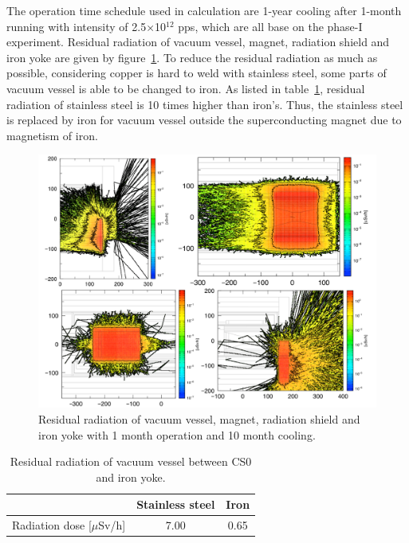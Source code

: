 The operation time schedule used in calculation are 1-year cooling after 1-month running with intensity of 2.5$\times$10$^{12}$ pps, which are all base on the phase-I experiment.
Residual radiation of vacuum vessel, magnet, radiation shield and iron yoke are given by figure~\ref{2part}.
To reduce the residual radiation as much as possible, considering copper is hard to weld with stainless steel, some parts of vacuum vessel is able to be changed to iron.
As listed in table~\ref{vecuum}, residual radiation of stainless steel is 10 times higher than iron's.
Thus, the stainless steel is replaced by iron for vacuum vessel outside the superconducting magnet due to magnetism of iron.
 \begin{figure}[H]
  \centering
  \includegraphics[scale=0.43]{chapter3/fig/partres.pdf}
  \caption{Residual radiation of vacuum vessel, magnet, radiation shield and iron yoke with 1 month operation and 10 month cooling.}
  \label{2part}
 \end{figure}
\begin{table}[H]
 \centering
 \begin{tabular}{ccc} \hline \hline
  & Stainless steel & Iron  \\ \hline
  Radiation dose [$\mu$Sv/h] & 7.00 & 0.65 \\ \hline \hline
 \end{tabular}
 \caption{Residual radiation of vacuum vessel between CS0 and iron yoke.}
 \label{vecuum}
\end{table}

